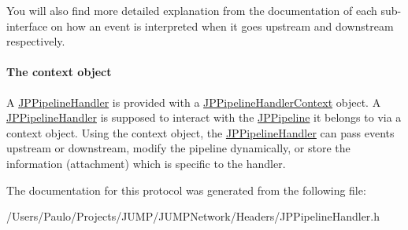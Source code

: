 You will also find more detailed explanation from the documentation of each sub-\/interface on how an event is interpreted when it goes upstream and downstream respectively.

\paragraph*{The context object}

A \hyperlink{a00029}{JPPipelineHandler} is provided with a \hyperlink{a00030}{JPPipelineHandlerContext} object. A \hyperlink{a00029}{JPPipelineHandler} is supposed to interact with the \hyperlink{a00019}{JPPipeline} it belongs to via a context object. Using the context object, the \hyperlink{a00029}{JPPipelineHandler} can pass events upstream or downstream, modify the pipeline dynamically, or store the information (attachment) which is specific to the handler. 

The documentation for this protocol was generated from the following file:\begin{DoxyCompactItemize}
\item 
/Users/Paulo/Projects/JUMP/JUMPNetwork/Headers/JPPipelineHandler.h\end{DoxyCompactItemize}
